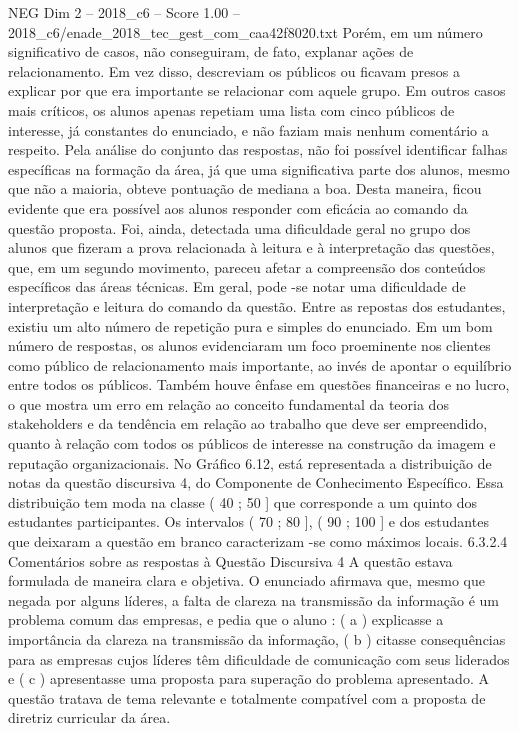 \begin{textsample}{NEG Dim 2 – 2018\_c6 – Score 1.00 – 2018\_c6/enade\_2018\_tec\_gest\_com\_caa42f8020.txt}
Porém, em um número significativo de casos, não conseguiram, de fato, explanar ações de relacionamento.
Em vez disso, descreviam os públicos ou ficavam presos a explicar por que era importante se relacionar com aquele grupo.
Em outros casos mais críticos, os alunos apenas repetiam uma lista com cinco públicos de interesse, já constantes do enunciado, e não faziam mais nenhum comentário a respeito.
Pela análise do conjunto das respostas, não foi possível identificar falhas específicas na formação da área, já que uma significativa parte dos alunos, mesmo que não a maioria, obteve pontuação de mediana a boa.
Desta maneira, ficou evidente que era possível aos alunos responder com eficácia ao comando da questão proposta.
Foi, ainda, detectada uma dificuldade geral no grupo dos alunos que fizeram a prova relacionada à leitura e à interpretação das questões, que, em um segundo movimento, pareceu afetar a compreensão dos conteúdos específicos das áreas técnicas.
Em geral, pode -se notar uma dificuldade de interpretação e leitura do comando da questão.
Entre as repostas dos estudantes, existiu um alto número de repetição pura e simples do enunciado.
Em um bom número de respostas, os alunos evidenciaram um foco proeminente nos clientes como público de relacionamento mais importante, ao invés de apontar o equilíbrio entre todos os públicos.
Também houve ênfase em questões financeiras e no lucro, o que mostra um erro em relação ao conceito fundamental da teoria dos stakeholders e da tendência em relação ao trabalho que deve ser empreendido, quanto à relação com todos os públicos de interesse na construção da imagem e reputação organizacionais.
No Gráfico 6.12, está representada a distribuição de notas da questão discursiva 4, do Componente de Conhecimento Específico.
Essa distribuição tem moda na classe ( 40 ; 50 ] que corresponde a um quinto dos estudantes participantes.
Os intervalos ( 70 ; 80 ], ( 90 ; 100 ] e dos estudantes que deixaram a questão em branco caracterizam -se como máximos locais. 6.3.2.4 Comentários sobre as respostas à Questão Discursiva 4 A questão estava formulada de maneira clara e objetiva.
O enunciado afirmava que, mesmo que negada por alguns líderes, a falta de clareza na transmissão da informação é um problema comum das empresas, e pedia que o aluno : ( a ) explicasse a importância da clareza na transmissão da informação, ( b ) citasse consequências para as empresas cujos líderes têm dificuldade de comunicação com seus liderados e ( c ) apresentasse uma proposta para superação do problema apresentado.
A questão tratava de tema relevante e totalmente compatível com a proposta de diretriz curricular da área.

\end{textsample}
